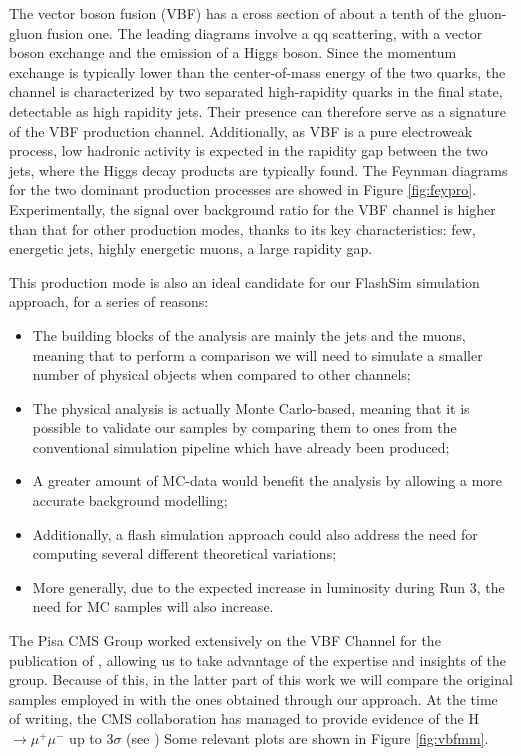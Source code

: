 The vector boson fusion (VBF) has a cross section of about a tenth of the gluon-gluon fusion one. The leading diagrams involve a qq scattering, with a
vector boson exchange and the emission of a Higgs boson. Since the momentum exchange
is typically lower than the center-of-mass energy of the two quarks, the channel is characterized by two separated high-rapidity quarks in the final state, detectable as high rapidity
jets. Their presence can therefore serve as a signature of the VBF production channel. Additionally, as VBF is a pure electroweak process, low hadronic activity is expected in the
rapidity gap between the two jets, where the Higgs decay products are typically found. The Feynman diagrams for the two dominant production processes are showed in Figure \ref{fig:feypro}. Experimentally, the signal over background ratio for the VBF channel is higher than that for other production modes, thanks to its key characteristics: few, energetic jets, highly energetic muons, a large rapidity gap.

This production mode is also an ideal candidate for our FlashSim simulation approach, for a series of reasons:

\begin{itemize}
    \item The building blocks of the analysis are mainly the jets and the muons, meaning that to perform a comparison we will need to simulate a smaller number of physical objects when compared to other channels;
    \item The physical analysis is actually Monte Carlo-based, meaning that it is possible to validate our samples by comparing them to ones from the conventional simulation pipeline which have already been produced;
    \item A greater amount of MC-data would benefit the analysis by allowing a more accurate background modelling;
    \item Additionally, a flash simulation approach could also address the need for computing several different theoretical variations;
    \item More generally, due to the expected increase in luminosity during Run 3, the need for MC samples will also increase.
\end{itemize}

The Pisa CMS Group worked extensively on the VBF Channel for the publication of \cite{CMS-PAS-HIG-19-006}, allowing us to take advantage of the expertise and insights of the group.
Because of this, in the latter part of this work we will compare the original samples employed in \cite{CMS-PAS-HIG-19-006} with the ones obtained through our approach.
At the time of writing, the CMS collaboration has managed to provide evidence of the H$\rightarrow\mu^+\mu^-$ up to 3$\sigma$ (see \cite{Sirunyan_2021}) Some relevant plots are shown in Figure \ref{fig:vbfmm}.

